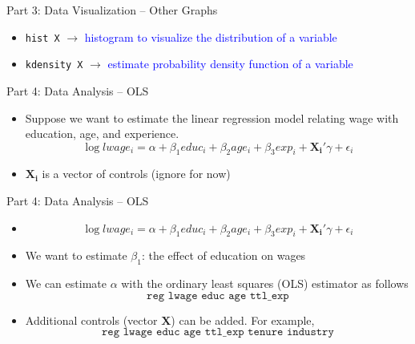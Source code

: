 \documentclass[11pt,notes=hide,aspectratio=169,mathserif]{beamer}
\begin{document}
\begin{frame}{Part 3: Data Visualization -- Other Graphs}
    \begin{itemize}
    \item \texttt{hist X}   $\rightarrow$ \textcolor{blue}{histogram to visualize the distribution of a variable}
    \item \texttt{kdensity X}   $\rightarrow$ \textcolor{blue}{estimate probability density function of a variable}
    \end{itemize}
\end{frame}

\begin{frame}{Part 4: Data Analysis -- OLS}
    \begin{itemize}
        \item Suppose we want to estimate the linear regression model relating wage with education, age, and experience.
        $$\log lwage_i = \alpha + \beta_1 educ_i + \beta_2 age_i + \beta_3 exp_i + \mathbf{X_i}'\gamma + \epsilon_i $$ 
        \item $\mathbf{X_i}$ is a vector of controls (ignore for now)
    \end{itemize}
\end{frame}

\begin{frame}{Part 4: Data Analysis -- OLS}
    \begin{itemize}
        \item 
        $$\log lwage_i = \alpha + \beta_1 educ_i + \beta_2 age_i + \beta_3 exp_i + \mathbf{X_i}'\gamma + \epsilon_i $$ 
        \item We want to estimate $\beta_1$: the effect of education on wages
        \item We can estimate $\alpha$ with the ordinary least squares (OLS) estimator as follows
            $$\texttt{reg lwage educ age ttl\_exp}$$ 
        \item Additional controls (vector $\mathbf{X}$) can be added. For example,
            $$\texttt{reg lwage educ age ttl\_exp tenure industry}$$ 
    \end{itemize}
\end{frame}
\end{document}

